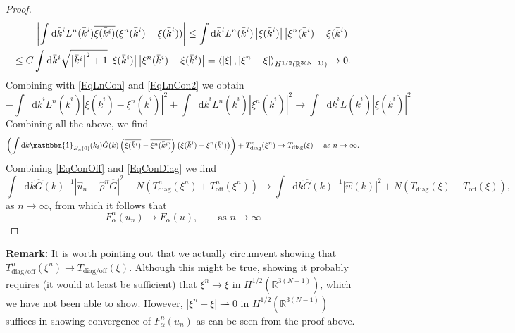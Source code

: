 \documentclass[a4paper,11pt]{article}
\newcommand{\abs}[1]{\left\lvert #1 \right\rvert}
\newcommand*\diff{\mathop{}\!\mathrm{d}}
\newcommand{\R}{\mathbb{R}}
\numberwithin{equation}{section}
\begin{document}
\begin{proof}
\begin{equation}
\begin{aligned}
\abs{\int\diff \bar{k}^i L^n(\bar{k}^i)\overline{\xi(\bar{k}^i)}(\xi^n(\bar{k}^i)-\xi(\bar{k}^i))}\leq\int\diff \bar{k}^i L^n(\bar{k}^i)\abs{\xi(\bar{k}^i)}\abs{\xi^n(\bar{k}^i)-\xi(\bar{k}^i)}\\\leq C\int\diff \bar{k}^i\sqrt{\abs{\bar{k}^i}^2+1}\abs{\xi(\bar{k}^i)}\abs{\xi^n(\bar{k}^i)-\xi(\bar{k}^i)}=\braket{\abs{\xi},\abs{\xi^n-\xi}}_{H^{1/2}(\R^{3(N-1)})}\to0.
\end{aligned}
\end{equation}
Combining with \eqref{EqLnCon} and \eqref{EqLnCon2} we obtain \begin{equation}
-\int\diff\bar{k}^iL^n(\bar{k}^i)\left\lvert\xi(\bar{k}^i)-\xi^n(\bar{k}^i)\right\rvert^2+\int\diff \bar{k}^i L^n(\bar{k}^i)\abs{\xi^n(\bar{k}^i)}^2\to\int\diff \bar{k}^i L(\bar{k}^i)\abs{\xi(\bar{k}^i)}^2
\end{equation}
Combining all the above, we find \begin{equation}\label{EqConDiag}
\left(\int\diff k\mathbbm{1}_{B_n(0)}(k_i)\hat{G}(k)\left(\overline{\xi(\bar{k}^i)}-\overline{\xi^n(\bar{k}^i)}\right)\left(\xi(\bar{k}^i)-\xi^n(\bar{k}^i)\right)\right)+T_{\text{diag}}^n(\xi^n)\to T_{\text{diag}}(\xi)\quad\text{ as }n\to\infty.
\end{equation}
Combining \eqref{EqConOff} and \eqref{EqConDiag} we find \begin{equation}
\int\diff k \hat{G}(k)^{-1}\abs{\hat{u}_n-\hat{\rho}^n\hat{G}}^2+N(T_{\text{diag}}^n(\xi^n)+T_{\text{off}}^n(\xi^n))\to \int\diff k \hat{G}(k)^{-1}\abs{\hat{w}(k)}^2+N(T_{\text{diag}}(\xi)+T_{\text{off}}(\xi)),
\end{equation}
as $ n\to\infty $, from which it follows that \begin{equation}
F^n_\alpha(u_n)\to F_\alpha(u),\qquad\text{as }n\to\infty
\end{equation}
	\end{proof}
	\textbf{Remark:} It is worth pointing out that we actually circumvent showing that $ T^n_{\text{diag}/\text{off}}(\xi^n)\to T_{\text{diag}/\text{off}}(\xi) $. Although this might be true, showing it probably requires (it would at least be sufficient) that $ \xi^n\to\xi $ in $ H^{1/2}(\R^{3(N-1)}) $, which we have not been able to show. However, $ \abs{\xi^n-\xi}\rightharpoonup0 $ in $ H^{1/2}(\R^{3(N-1)}) $ suffices in showing convergence of $ F_\alpha^n(u_n) $ as can be seen from the proof above.\\
\end{document}
